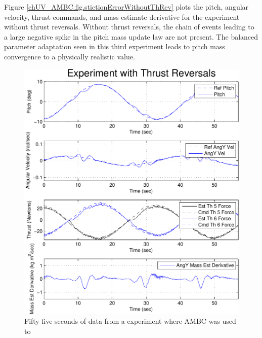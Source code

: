 Figure \ref{chUV_AMBC.fig.stictionErrorWithoutThRev} plots the pitch,
angular velocity, thrust commands, and mass estimate derivative for
the experiment without thrust reversals.  Without thrust reversals,
the chain of events leading to a large negative spike in the pitch
mass update law are not present. The balanced parameter adaptation
seen in this third experiment leads to pitch mass convergence to a
physically realistic value.


\begin{center}
\begin{figure}[htbp]
  \begin{center}
    \includegraphics[width=150mm]{./chUV_AMBC/images/stictionErrorWithThrustReversals}
  \end{center}
  \caption{ 
    Fifty five seconds of data from a experiment where \ac{AMBC} was used to
}
\end{figure}
\end{center}
